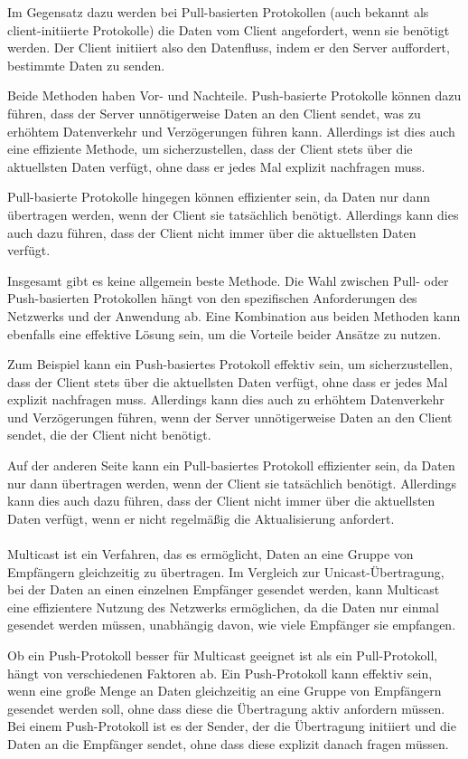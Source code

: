 Im Gegensatz dazu werden bei Pull-basierten Protokollen (auch bekannt als client-initiierte Protokolle) die Daten vom Client angefordert, wenn sie benötigt werden. Der Client initiiert also den Datenfluss, indem er den Server auffordert, bestimmte Daten zu senden.

Beide Methoden haben Vor- und Nachteile. Push-basierte Protokolle können dazu führen, dass der Server unnötigerweise Daten an den Client sendet, was zu erhöhtem Datenverkehr und Verzögerungen führen kann. Allerdings ist dies auch eine effiziente Methode, um sicherzustellen, dass der Client stets über die aktuellsten Daten verfügt, ohne dass er jedes Mal explizit nachfragen muss.

Pull-basierte Protokolle hingegen können effizienter sein, da Daten nur dann übertragen werden, wenn der Client sie tatsächlich benötigt. Allerdings kann dies auch dazu führen, dass der Client nicht immer über die aktuellsten Daten verfügt.

Insgesamt gibt es keine allgemein beste Methode. Die Wahl zwischen Pull- oder Push-basierten Protokollen hängt von den spezifischen Anforderungen des Netzwerks und der Anwendung ab. Eine Kombination aus beiden Methoden kann ebenfalls eine effektive Lösung sein, um die Vorteile beider Ansätze zu nutzen.

Zum Beispiel kann ein Push-basiertes Protokoll effektiv sein, um sicherzustellen, dass der Client stets über die aktuellsten Daten verfügt, ohne dass er jedes Mal explizit nachfragen muss. Allerdings kann dies auch zu erhöhtem Datenverkehr und Verzögerungen führen, wenn der Server unnötigerweise Daten an den Client sendet, die der Client nicht benötigt.

Auf der anderen Seite kann ein Pull-basiertes Protokoll effizienter sein, da Daten nur dann übertragen werden, wenn der Client sie tatsächlich benötigt. Allerdings kann dies auch dazu führen, dass der Client nicht immer über die aktuellsten Daten verfügt, wenn er nicht regelmäßig die Aktualisierung anfordert.
\\\\
Multicast ist ein Verfahren, das es ermöglicht, Daten an eine Gruppe von Empfängern gleichzeitig zu übertragen. Im Vergleich zur Unicast-Übertragung, bei der Daten an einen einzelnen Empfänger gesendet werden, kann Multicast eine effizientere Nutzung des Netzwerks ermöglichen, da die Daten nur einmal gesendet werden müssen, unabhängig davon, wie viele Empfänger sie empfangen.

Ob ein Push-Protokoll besser für Multicast geeignet ist als ein Pull-Protokoll, hängt von verschiedenen Faktoren ab. Ein Push-Protokoll kann effektiv sein, wenn eine große Menge an Daten gleichzeitig an eine Gruppe von Empfängern gesendet werden soll, ohne dass diese die Übertragung aktiv anfordern müssen. Bei einem Push-Protokoll ist es der Sender, der die Übertragung initiiert und die Daten an die Empfänger sendet, ohne dass diese explizit danach fragen müssen.

